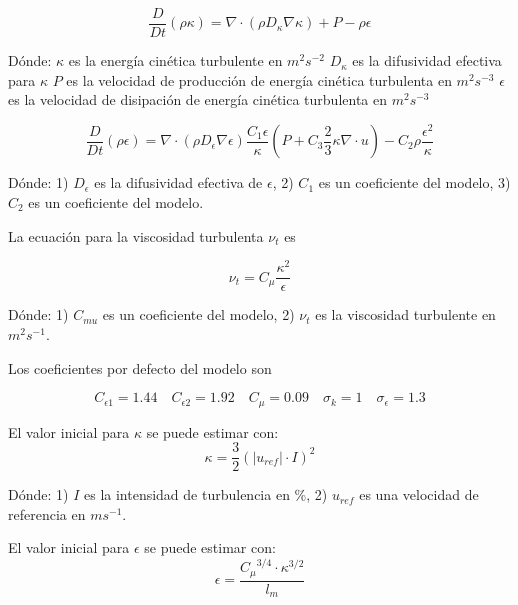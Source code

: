 \begin{equation}\label{eq:k}
  \frac{D}{Dt}(\rho \kappa) = \nabla \cdot (\rho D_{\kappa}\nabla \kappa) + P - \rho \epsilon
\end{equation}

Dónde:
$\kappa$ es la energía cinética turbulente en $m^{2}s^{-2}$
$D_{\kappa}$ es la difusividad efectiva para $\kappa$
$P$ es la velocidad de producción de energía cinética turbulenta en $m^{2}s^{-3}$
$\epsilon$ es la velocidad de disipación de energía cinética turbulenta en $m^{2}s^{-3}$


\begin{equation}\label{eq:k}
  \frac{D}{Dt}(\rho \epsilon) = \nabla \cdot (\rho D_{\epsilon}\nabla \epsilon) \frac{C_{1}\epsilon}{\kappa} \left( P+C_{3}\frac{2}{3}\kappa\nabla\cdot u \right) - C_{2}\rho\frac{\epsilon^{2}}{\kappa}
\end{equation}

Dónde: 1) $D_{\epsilon}$ es la difusividad efectiva de $\epsilon$, 2) $C_{1}$ es
un coeficiente del modelo, 3) $C_{2}$ es un coeficiente del modelo.

La ecuación para la viscosidad turbulenta $\nu_{t}$ es

\begin{equation}\label{eq:nu_t}
  \nu_{t} = C_{\mu}\frac{\kappa^{2}}{\epsilon}
\end{equation}

Dónde: 1) $C_{mu}$ es un coeficiente del modelo, 2) $\nu_{t}$ es la viscosidad
turbulente en $m^{2}s^{-1}$.

Los coeficientes por defecto del modelo son

\begin{equation}
  C_{\epsilon 1}=1.44
  \quad
  C_{\epsilon 2}=1.92
  \quad
  C_{\mu}=0.09
  \quad
  \sigma_{k}=1
  \quad
  \sigma_{\epsilon}=1.3
\end{equation}

El valor inicial para $\kappa$ se puede estimar con:
\begin{equation}\label{eq:kappa_est}
  \kappa = \frac{3}{2} {\left( |u_{ref}| \cdot I \right)}^{2}
\end{equation}

Dónde: 1) $I$ es la intensidad de turbulencia en \%, 2) $u_{ref}$ es una
velocidad de referencia en $ms^{-1}$.

El valor inicial para $\epsilon$ se puede estimar con:
\begin{equation}\label{eq:epsilon_est}
  \epsilon = \frac{{C_{\mu}}^{3/4} \cdot {\kappa}^{3/2}} {l_{m}}
\end{equation}

